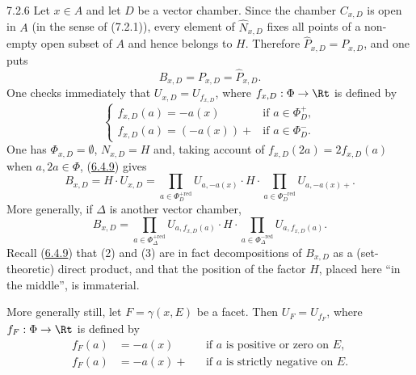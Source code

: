 \documentclass[12pt,a4paper,oneside,english]{smfart}
\newcommand{\btref}[1]{\hyperlink{bt:#1}{#1}}
\theoremstyle{definition}
\theoremstyle{bt}
\begin{document}
\begin{btpar}{7.2.6}
Let $x\in A$ and let $D$ be a vector chamber. Since the chamber
$C_{x,D}$ is open in $A$ (in the sense of (7.2.1)), every element of
$\widehat{N}_{x,D}$ fixes all points of a non-empty open subset of $A$
and hence belongs to $H$. Therefore
$\widehat{P}_{x,D}=P_{x,D}$, and one puts
\[
  B_{x,D}=P_{x,D}=\widehat{P}_{x,D}.
\]
One checks immediately that $U_{x,D}=U_{f_{x,D}}$, where
$f_{x,D}:\Phi\to\Rt$ is defined by
\begin{equation}
  \begin{cases}
    f_{x,D}(a)=-a(x) & \text{if } a\in\Phi^{+}_{D},\\[2pt]
    f_{x,D}(a)=(-a(x))+ & \text{if } a\in\Phi^{-}_{D}.
  \end{cases}
  \tag{1}
\end{equation}
One has $\Phi_{x,D}=\emptyset$, $N_{x,D}=H$ and, taking account of
$f_{x,D}(2a)=2f_{x,D}(a)$ when $a,2a\in\Phi$, (\btref{6.4.9}) gives
\begin{equation}
  B_{x,D}=H\cdot U_{x,D}
   =\prod_{a\in\Phi^{+\mathrm{red}}_{D}}U_{a,-a(x)}\cdot H\cdot
    \prod_{a\in\Phi^{-\mathrm{red}}_{D}}U_{a,-a(x)+}.
  \tag{2}
\end{equation}
More generally, if $\Delta$ is another vector chamber,
\begin{equation}
  B_{x,D}=\prod_{a\in\Phi^{+\mathrm{red}}_{\Delta}}U_{a,f_{x,D}(a)}\cdot H\cdot
          \prod_{a\in\Phi^{-\mathrm{red}}_{\Delta}}U_{a,f_{x,D}(a)}.
  \tag{3}
\end{equation}
Recall (\btref{6.4.9}) that (2) and (3) are in fact decompositions of $B_{x,D}$
as a (set-theoretic) direct product, and that the position of the factor
$H$, placed here ``in the middle'', is immaterial.

More generally still, let $F=\gamma(x,E)$ be a facet. Then $U_F=U_{f_F}$,
where $f_F:\Phi\to\Rt$ is defined by
\[
\begin{aligned}
f_F(a)&=-a(x) &&\text{if }a\text{ is positive or zero on }E,\\
f_F(a)&=-a(x)+ &&\text{if }a\text{ is strictly negative on }E.
\end{aligned}
\]
\end{btpar}
\end{document}
